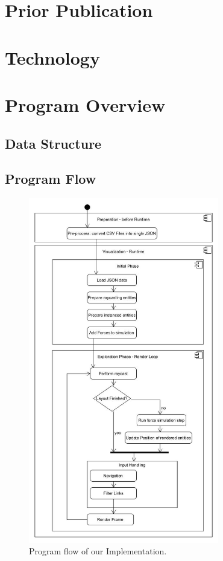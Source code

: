\section{Prior Publication}

\section{Technology}

\section{Program Overview}

\subsection{Data Structure}

\subsection{Program Flow}
\begin{figure}[h]
    \centering
    \includegraphics[width=0.74\textwidth]{graphics/vrgraph_flow.jpg}
    \caption{Program flow of our Implementation.}
    \label{fig:impl_programFlow}
\end{figure}

